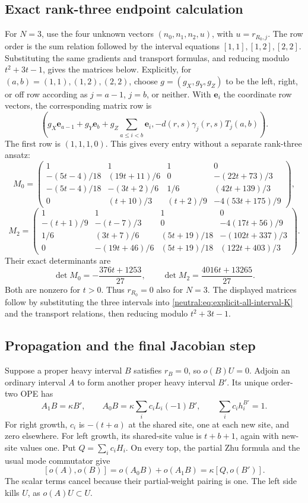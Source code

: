 \documentclass[11pt,a4paper]{article}
\numberwithin{equation}{section}
\theoremstyle{definition}\newtheorem{definition}[theorem]{Definition}
\theoremstyle{remark}\newtheorem{remark}[theorem]{Remark}
\begin{document}
\subsection{Exact rank-three endpoint calculation}

For \(N=3\), use the four unknown vectors
\((n_0,n_1,n_2,u)\), with \(u=r_{R_0,j}\).
The row order is the sum relation followed by the interval
equations \([1,1],[1,2],[2,2]\). Substituting the same gradients
and transport formulas, and reducing modulo \(t^2+3t-1\), gives
the matrices below. Explicitly, for $(a,b)=(1,1),(1,2),(2,2)$,
choose $g=(g_X,g_Y,g_Z)$ to be the left, right, or off row according
as $j=a-1$, $j=b$, or neither. With $\mathbf e_i$ the coordinate
row vectors, the corresponding matrix row is
\[
 \left(g_X\mathbf e_{a-1}+g_Y\mathbf e_b+
       g_Z\sum_{a\le i<b}\mathbf e_i,
       -d(r,s)\gamma_j(r,s)T_j(a,b)\right).
\]
The first row is $(1,1,1,0)$. This gives every entry without a
separate rank-three ansatz:
{\small
\[
M_0=\begin{pmatrix}
1&1&1&0\\
-(5t-4)/18&(19t+11)/6&0&-(22t+73)/3\\
-(5t-4)/18&-(3t+2)/6&1/6&(42t+139)/3\\
0&(t+10)/3&(t+2)/9&-4(53t+175)/9
\end{pmatrix},
\]
\[
M_2=\begin{pmatrix}
1&1&1&0\\
-(t+1)/9&-(t-7)/3&0&-4(17t+56)/9\\
1/6&(3t+7)/6&(5t+19)/18&-(102t+337)/3\\
0&-(19t+46)/6&(5t+19)/18&(122t+403)/3
\end{pmatrix}.
\]
}
Their exact determinants are
\[
       \det M_0=-\frac{376t+1253}{27},\qquad
       \det M_2=\frac{4016t+13265}{27}.
\]
Both are nonzero for \(t>0\). Thus \(r_{R_0}=0\) also for
\(N=3\). The displayed matrices follow by substituting the three
intervals into \eqref{neutral:eq:explicit-all-interval-K} and the
transport relations, then reducing modulo \(t^2+3t-1\).

\subsection{Propagation and the final Jacobian step}

Suppose a proper heavy interval \(B\) satisfies \(r_B=0\), so
\(o(B)U=0\). Adjoin an ordinary interval \(A\) to form another
proper heavy interval \(B'\). Its unique order-two OPE has
\[
 A_1B=\kappa B',\qquad
 A_0B=\kappa\sum_i c_iL_i(-1)B',\qquad
 \sum_i c_i h_i^{B'}=1.
\]
For right growth, \(c_i\) is \(-(t+a)\) at the shared site,
one at each new site, and zero elsewhere. For left growth, its
shared-site value is \(t+b+1\), again with new-site values one.
Put \(Q=\sum_i c_iH_i\). On every top, the partial Zhu formula
and the usual mode commutator give
\[
 [o(A),o(B)]=o(A_0B)+o(A_1B)=\kappa[Q,o(B')].
\]
The scalar terms cancel because their partial-weight pairing is
one. The left side kills \(U\), as \(o(A)U\subset U\).
\end{document}

